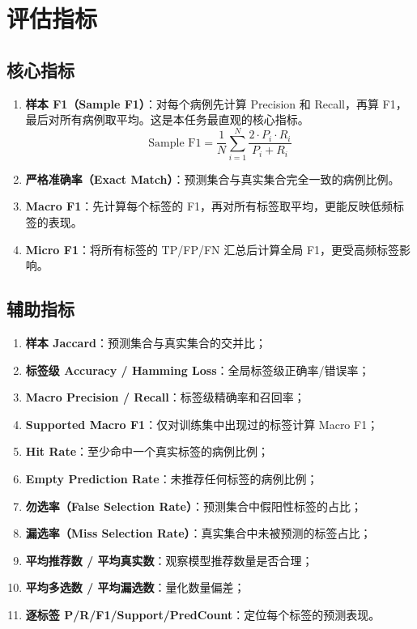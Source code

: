 \documentclass[12pt,a4paper]{article}
\begin{document}
\section{评估指标}

\subsection{核心指标}

\begin{enumerate}[label=(\arabic*)]
    \item \textbf{样本 F1（Sample F1）}：对每个病例先计算 Precision 和 Recall，再算 F1，最后对所有病例取平均。这是本任务最直观的核心指标。
    \begin{equation}
        \text{Sample F1} = \frac{1}{N} \sum_{i=1}^{N} \frac{2 \cdot P_i \cdot R_i}{P_i + R_i}
    \end{equation}
    \item \textbf{严格准确率（Exact Match）}：预测集合与真实集合完全一致的病例比例。
    \item \textbf{Macro F1}：先计算每个标签的 F1，再对所有标签取平均，更能反映低频标签的表现。
    \item \textbf{Micro F1}：将所有标签的 TP/FP/FN 汇总后计算全局 F1，更受高频标签影响。
\end{enumerate}

\subsection{辅助指标}

\begin{enumerate}[label=(\arabic*)]
    \item \textbf{样本 Jaccard}：预测集合与真实集合的交并比；
    \item \textbf{标签级 Accuracy / Hamming Loss}：全局标签级正确率/错误率；
    \item \textbf{Macro Precision / Recall}：标签级精确率和召回率；
    \item \textbf{Supported Macro F1}：仅对训练集中出现过的标签计算 Macro F1；
    \item \textbf{Hit Rate}：至少命中一个真实标签的病例比例；
    \item \textbf{Empty Prediction Rate}：未推荐任何标签的病例比例；
    \item \textbf{勿选率（False Selection Rate）}：预测集合中假阳性标签的占比；
    \item \textbf{漏选率（Miss Selection Rate）}：真实集合中未被预测的标签占比；
    \item \textbf{平均推荐数 / 平均真实数}：观察模型推荐数量是否合理；
    \item \textbf{平均多选数 / 平均漏选数}：量化数量偏差；
    \item \textbf{逐标签 P/R/F1/Support/PredCount}：定位每个标签的预测表现。
\end{enumerate}
\end{document}
